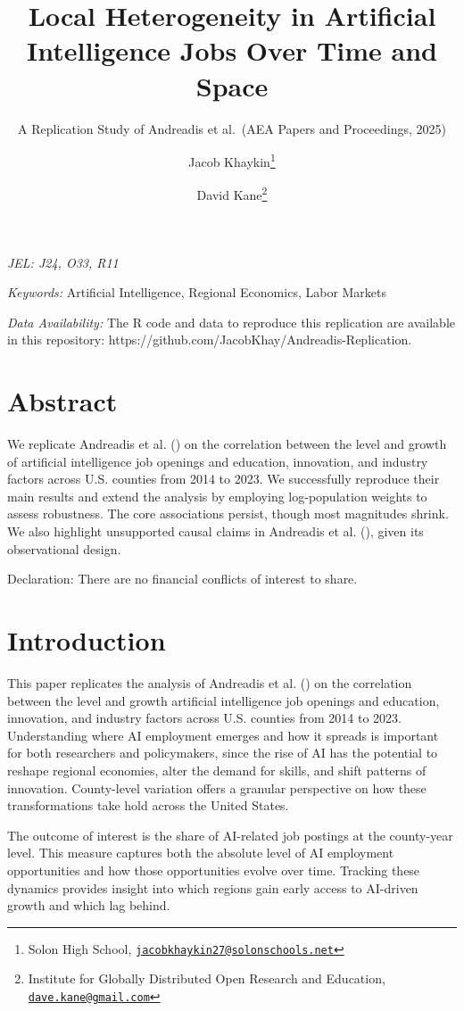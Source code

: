 \documentclass[
]{article}
\title{Local Heterogeneity in Artificial Intelligence Jobs Over Time and
Space}
\subtitle{A Replication Study of Andreadis et al.~(AEA Papers and
Proceedings, 2025)}
\author{Jacob Khaykin\footnote{Solon High School,
  \href{mailto:jacobkhaykin27@solonschools.net}{\nolinkurl{jacobkhaykin27@solonschools.net}}} \and David
Kane\footnote{Institute for Globally Distributed Open Research and
  Education,
  \href{mailto:dave.kane@gmail.com}{\nolinkurl{dave.kane@gmail.com}}}}
\date{}
\begin{document}
\maketitle


\emph{JEL: J24, O33, R11}

\emph{Keywords:} Artificial Intelligence, Regional Economics, Labor
Markets

\emph{Data Availability:} The R code and data to reproduce this
replication are available in this repository:
https://github.com/JacobKhay/Andreadis-Replication.

\section*{Abstract}\label{abstract}

We replicate Andreadis et al. () on
the correlation between the level and growth of artificial intelligence
job openings and education, innovation, and industry factors across U.S.
counties from 2014 to 2023. We successfully reproduce their main results
and extend the analysis by employing log-population weights to assess
robustness. The core associations persist, though most magnitudes
shrink. We also highlight unsupported causal claims in Andreadis et al.
(), given its observational design.

Declaration: There are no financial conflicts of interest to share.

\newpage

\section{Introduction}\label{introduction}

This paper replicates the analysis of Andreadis et al.
() on the correlation between the
level and growth artificial intelligence job openings and education,
innovation, and industry factors across U.S. counties from 2014 to 2023.
Understanding where AI employment emerges and how it spreads is
important for both researchers and policymakers, since the rise of AI
has the potential to reshape regional economies, alter the demand for
skills, and shift patterns of innovation. County-level variation offers
a granular perspective on how these transformations take hold across the
United States.

The outcome of interest is the share of AI-related job postings at the
county-year level. This measure captures both the absolute level of AI
employment opportunities and how those opportunities evolve over time.
Tracking these dynamics provides insight into which regions gain early
access to AI-driven growth and which lag behind.
\end{document}
